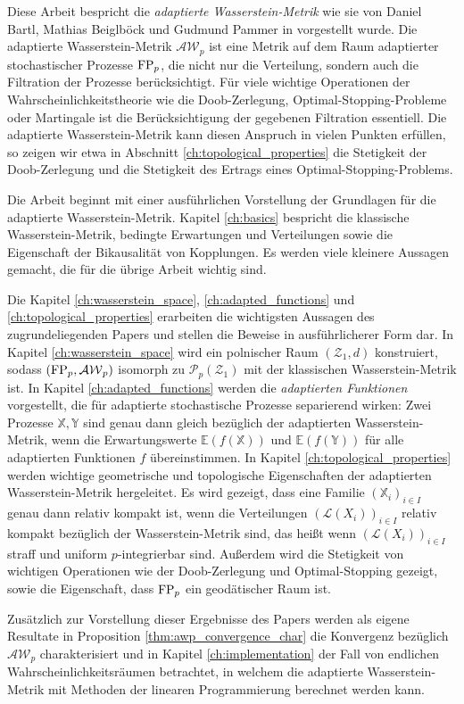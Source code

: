 Diese Arbeit bespricht die \emph{adaptierte Wasserstein-Metrik} wie sie von Daniel Bartl, Mathias Beiglböck und Gudmund Pammer in \cite{main_paper} vorgestellt wurde. Die adaptierte Wasserstein-Metrik $\mathcal{AW}_p$ ist eine Metrik auf dem Raum adaptierter stochastischer Prozesse $\operatorname{FP}_p$, die nicht nur die Verteilung, sondern auch die Filtration der Prozesse berücksichtigt. Für viele wichtige Operationen der Wahrscheinlichkeitstheorie wie die Doob-Zerlegung, Optimal-Stopping-Probleme oder Martingale ist die Berücksichtigung der gegebenen Filtration essentiell. Die adaptierte Wasserstein-Metrik kann diesen Anspruch in vielen Punkten erfüllen, so zeigen wir etwa in Abschnitt \ref{ch:topological_properties} die Stetigkeit der Doob-Zerlegung und die Stetigkeit des Ertrags eines Optimal-Stopping-Problems. 

Die Arbeit beginnt mit einer ausführlichen Vorstellung der Grundlagen für die adaptierte Wasserstein-Metrik. Kapitel \ref{ch:basics} bespricht die klassische Wasserstein-Metrik, bedingte Erwartungen und Verteilungen sowie die Eigenschaft der Bikausalität von Kopplungen. Es werden viele kleinere Aussagen gemacht, die für die übrige Arbeit wichtig sind.

Die Kapitel \ref{ch:wasserstein_space}, \ref{ch:adapted_functions} und \ref{ch:topological_properties} erarbeiten die wichtigsten Aussagen des zugrundeliegenden Papers \cite{main_paper} und stellen die Beweise in ausführlicherer Form dar. In Kapitel \ref{ch:wasserstein_space} wird ein polnischer Raum $(\mathcal{Z}_1, d)$ konstruiert, sodass $(\operatorname{FP}_p, \mathcal{AW}_p)$ isomorph zu $\mathcal{P}_p(\mathcal{Z}_1)$ mit der klassischen Wasserstein-Metrik ist. In Kapitel \ref{ch:adapted_functions} werden die \emph{adaptierten Funktionen} vorgestellt, die für adaptierte stochastische Prozesse separierend wirken: Zwei Prozesse $\mathbb{X,Y}$ sind genau dann gleich bezüglich der adaptierten Wasserstein-Metrik, wenn die Erwartungswerte $\mathbb{E}(f(\mathbb{X}))$ und $\mathbb{E}(f(\mathbb{Y}))$ für alle adaptierten Funktionen $f$ übereinstimmen. In Kapitel \ref{ch:topological_properties} werden wichtige geometrische und topologische Eigenschaften der adaptierten Wasserstein-Metrik hergeleitet. Es wird gezeigt, dass eine Familie $(\mathbb{X}_i)_{i\in I}$ genau dann relativ kompakt ist, wenn die Verteilungen $(\mathcal{L}(X_i))_{i\in I}$ relativ kompakt bezüglich der Wasserstein-Metrik sind, das heißt wenn $(\mathcal{L}(X_i))_{i\in I}$ straff und uniform $p$-integrierbar sind. Außerdem wird die Stetigkeit von wichtigen Operationen wie der Doob-Zerlegung und Optimal-Stopping gezeigt, sowie die Eigenschaft, dass $\operatorname{FP}_p$ ein geodätischer Raum ist.

Zusätzlich zur Vorstellung dieser Ergebnisse des Papers werden als eigene Resultate in Proposition \ref{thm:awp_convergence_char} die Konvergenz bezüglich $\mathcal{AW}_p$ charakterisiert und in Kapitel \ref{ch:implementation} der Fall von endlichen Wahrscheinlichkeitsräumen betrachtet, in welchem die adaptierte Wasserstein-Metrik mit Methoden der linearen Programmierung berechnet werden kann.
